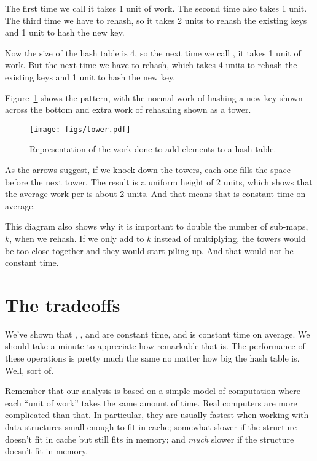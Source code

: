 \documentclass[12pt]{book}
\theoremstyle{exercise}
\begin{document}

The first time we call  it takes 1 unit of work. The second
time also takes 1 unit. The third time we have to rehash, so it takes 2
units to rehash the existing keys and 1 unit to hash the new key.

Now the size of the hash table is 4, so the next time we call
, it takes 1 unit of work. But the next time we have to
rehash, which takes 4 units to rehash the existing keys and 1 unit to
hash the new key.


Figure~\ref{fig-hashtable} shows the pattern, with the normal work of hashing
a new key shown across the bottom and extra work of rehashing shown as a
tower.

\begin{figure}
\centerline{\texttt{[image: figs/tower.pdf]}}
\caption{Representation of the work done to add elements to a hash table.}
\label{fig-hashtable}
\end{figure}

As the arrows suggest, if we knock down the towers, each one fills the
space before the next tower. The result is a uniform height of 2 units,
which shows that the average work per  is about 2 units. And
that means that  is constant time on average.

This diagram also shows why it is important to double the number of
sub-maps, $k$, when we rehash. If we only add to $k$
instead of multiplying, the towers would be too close together and
they would start piling up. And that would not be constant
time.



\section{The tradeoffs}
\label{the-tradeoffs}

We've shown that , , and 
are constant time, and  is constant time on average. We
should take a minute to appreciate how remarkable that is. The
performance of these operations is pretty much the same no matter how
big the hash table is. Well, sort of.


Remember that our analysis is based on a simple model of computation
where each ``unit of work'' takes the same amount of time. Real
computers are more complicated than that. In particular, they are
usually fastest when working with data structures small enough to fit in
cache; somewhat slower if the structure doesn't fit in cache but still
fits in memory; and \emph{much} slower if the structure doesn't fit in
memory.
\end{document}
